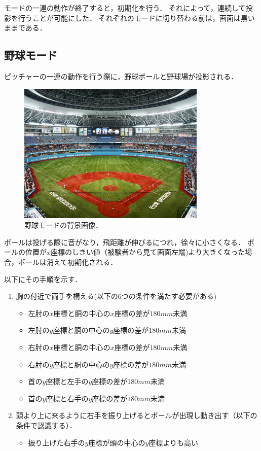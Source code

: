 モードの一連の動作が終了すると，初期化を行う．
それによって，連続して投影を行うことが可能にした．
それぞれのモードに切り替わる前は，画面は黒いままである．

\subsection{野球モード}
ピッチャーの一連の動作を行う際に，野球ボールと野球場が投影される．

\vspace{1cm}
\begin{figure}[h]
    \centering
    \includegraphics[width=9cm]{image/baseball_back.jpg}
    \caption[野球モードの背景画像]{野球モードの背景画像．}
  \label{kinect}
\end{figure}
\vspace{1cm}

ボールは投げる際に音がなり，飛距離が伸びるにつれ，徐々に小さくなる．
ボールの位置が$x$座標のしきい値（被験者から見て画面左端)より大きくなった場合，ボールは消えて初期化される．
\clearpage

以下にその手順を示す．

\begin{enumerate}
    \item 胸の付近で両手を構える(以下の6つの条件を満たす必要がある)
        \begin{itemize}
            \item 左肘の$x$座標と胴の中心の$x$座標の差が$180mm$未満
            \item 左肘の$y$座標と胴の中心の$y$座標の差が$180mm$未満
            \item 右肘の$x$座標と胴の中心の$x$座標の差が$180mm$未満
            \item 右肘の$y$座標と胴の中心の$y$座標の差が$180mm$未満
            \item 首の$y$座標と左手の$y$座標の差が$180mm$未満
            \item 首の$y$座標と右手の$y$座標の差が$180mm$未満
        \end{itemize}
    \item 頭より上に来るように右手を振り上げるとボールが出現し動き出す（以下の条件で認識する）．
        \begin{itemize}
            \item 振り上げた右手の$y$座標が頭の中心の$y$座標よりも高い
        \end{itemize}
\end{enumerate}


